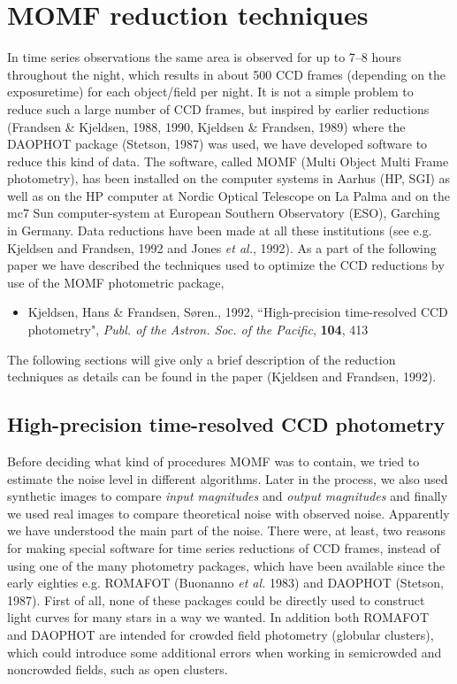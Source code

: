 \documentclass[]{article}
\begin{document}
\section{MOMF reduction techniques}
In time series observations
the same area is observed for up to 7--8 hours throughout the
night, which results in about 500 CCD frames (depending on the
exposuretime) for each object/field 
per night.
It is not a simple problem to reduce such a large number of 
CCD frames, but inspired by earlier reductions (Frandsen \& Kjeldsen,
1988, 1990, Kjeldsen \& Frandsen, 1989) where the 
DAOPHOT package (Stetson, 1987)
was used, we have developed software to reduce this kind of data.
The software, called MOMF (Multi Object Multi Frame photometry), has been
installed on the computer systems in Aarhus (HP, SGI) as well as on the HP 
computer
at Nordic Optical Telescope on La Palma and on the mc7 Sun computer-system at
European Southern Observatory (ESO), Garching in Germany.
Data reductions have been made at all these institutions (see e.g. 
Kjeldsen and Frandsen, 1992 and Jones {\em et al.}, 1992).
As a part of the following paper we have described the techniques 
used
to optimize the CCD reductions by use of the MOMF photometric 
package,
\begin{itemize}
\item Kjeldsen, Hans \& Frandsen, S{\o}ren., 1992,
 ``High-precision time-resolved CCD photometry",
{\em Publ. of the Astron. Soc. of the Pacific},
{\bf 104}, 413
\end{itemize}
The following sections will give only a brief description of the
reduction techniques as details can be found in the paper
(Kjeldsen and Frandsen, 1992).
\subsection{High-precision time-resolved CCD photometry}
Before deciding what kind of procedures MOMF was to contain, we
tried to estimate the noise level in different algorithms. Later in the
process, we also used synthetic images to compare {\em input 
magnitudes}
and {\em output magnitudes} and finally we used
real images to compare theoretical
noise with observed noise. Apparently we have understood the main 
part of the noise.
There were, at least, two reasons for
making special software for time series reductions of CCD frames,
instead of using one of the many photometry packages, which have been available 
since the early eighties e.g. ROMAFOT (Buonanno {\em et al.} 1983) and
DAOPHOT (Stetson, 1987). First of all, none of these packages could
be directly used to construct light curves for many stars in a way we
wanted.
In addition both ROMAFOT and DAOPHOT are intended for crowded
field photometry (globular clusters), which could introduce some 
additional errors when working
in semicrowded and noncrowded fields, such as open clusters.
 
\end{document}
